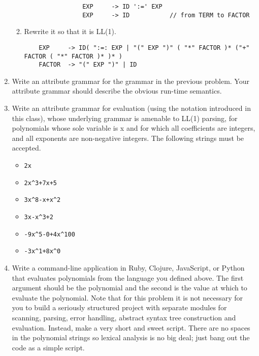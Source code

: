 \documentclass{article}
\begin{document}
\begin{enumerate}
\begin{enumerate}
            \begin{verbatim}
                EXP     -> ID ':=' EXP
                EXP     -> ID           // from TERM to FACTOR
            \end{verbatim}
            \item Rewrite it so that it is LL(1).
\begin{verbatim}
    EXP     -> ID( ":=: EXP | "(" EXP ")" ( "*" FACTOR )* ("+" FACTOR ( "*" FACTOR )* )* )
    FACTOR  -> "(" EXP ")" | ID
\end{verbatim}
        \end{enumerate}
    \pagebreak
    \item Write an attribute grammar for the grammar in the previous problem. Your attribute grammar should describe the obvious run-time semantics.
        
    \pagebreak
    \item Write an attribute grammar for evaluation (using the notation introduced in this class), whose underlying grammar is amenable to LL(1) parsing, for polynomials whose sole variable is x and for which all coefficients are integers, and all exponents are non-negative integers. The following strings must be accepted.
        \begin{itemize}
            \item \begin{verbatim}2x\end{verbatim}
            \item \begin{verbatim}2x^3+7x+5\end{verbatim}
            \item \begin{verbatim}3x^8-x+x^2\end{verbatim}
            \item \begin{verbatim}3x-x^3+2\end{verbatim}
            \item \begin{verbatim}-9x^5-0+4x^100\end{verbatim}
            \item \begin{verbatim}-3x^1+8x^0\end{verbatim}
        \end{itemize}
        
    \pagebreak
    \item Write a command-line application in Ruby, Clojure, JavaScript, or Python that evaluates polynomials from the language you defined above. The first argument should be the polynomial and the second is the value at which to evaluate the polynomial. Note that for this problem it is not necessary for you to build a seriously structured project with separate modules for scanning, parsing, error handling, abstract syntax tree construction and evaluation. Instead, make a very short and sweet script. There are no spaces in the polynomial strings so lexical analysis is no big deal; just bang out the code as a simple script.
    
    \pagebreak
\end{enumerate}
\end{document}
